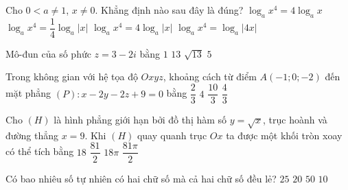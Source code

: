 \begin{ex}%
	Cho $0<a\neq1$, $x\neq0$. Khẳng định nào sau đây là đúng?
	\choice
	{$\log_a{x^4}=4\log_a{x}$}
	{$\log_a{x^4}=\dfrac{1}{4}\log_a{\left|x\right|}$}
	{\True $\log_a{x^4}=4\log_a{\left|x\right|}$}
	{$\log_a{x^4}=\log_a{\left|4x\right|}$}
\end{ex}
\begin{ex}%
	Mô-đun của số phức $z=3-2i$ bằng
	\choice
	{$1$}
	{$13$}
	{\True $\sqrt{13}$}
	{$5$}
\end{ex}
\begin{ex}%
	Trong không gian với hệ tọa độ $Oxyz$, khoảng cách từ điểm $A(-1;0;-2)$ đến mặt phẳng $(P)\colon x-2y-2z+9=0$ bằng
	\choice
	{$\dfrac{2}{3}$}
	{\True $4$}
	{$\dfrac{10}{3}$}
	{$\dfrac{4}{3}$}
\end{ex}
\begin{ex}%
	Cho $(H)$ là hình phẳng giới hạn bởi đồ thị hàm số $y=\sqrt{x}$, trục hoành và đường thẳng $x=9$. Khi $(H)$ quay quanh trục $Ox$ ta được một khối tròn xoay có  thể tích bằng
	\choice
	{$18$}
	{$\dfrac{81}{2}$}
	{$18\pi$}
	{\True $\dfrac{81\pi}{2}$}
\end{ex}
\begin{ex}%
	Có bao nhiêu số tự nhiên có hai chữ số mà cả hai chữ số đều lẻ?
	\choice
	{\True $25$}
	{$20$}
	{$50$}
	{$10$}
\end{ex}
